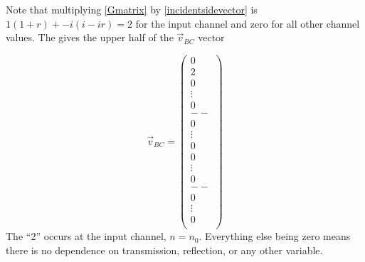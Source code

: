 Note that multiplying \ref{Gmatrix} by \ref{incidentsidevector} is $1(1+r) + -i(i - ir) = 2$ for the input channel and zero for all other channel values. The gives the upper half of the $\vec{v}_{BC}$ vector

\begin{equation}
\vec{v}_{BC} =
\left( \begin{array}{c}
0 \\
2 \\
0 \\
\vdots \\
0 \\
-- \\
0 \\
\vdots \\
0 \\
\hline
0 \\
\vdots \\
0 \\
-- \\
0 \\
\vdots \\
0 \\
\end{array} \right)
\label{vbc}
\end{equation}
The ``2'' occurs at the input channel, $n=n_0$.  Everything else being zero means there is no dependence on transmission, reflection, or any other variable.

